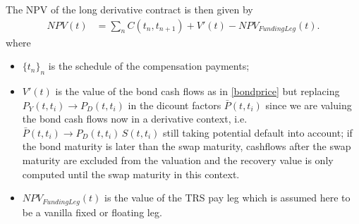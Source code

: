 \medskip
The NPV of the long derivative contract is then given by
%
\begin{align*}
NPV(t)&=\sum_{n}C(t_n,t_{n+1})+V'(t)-NPV_{FundingLeg}(t).
\end{align*}
where 
\begin{itemize}
\item $\{t_n\}_n$ is the schedule of the compensation
payments;
\item $V'(t)$ is the value of the bond cash flows as in
\eqref{bondprice} but replacing $P_Y(t,t_i)\rightarrow
P_D(t,t_i)$ in the dicount factors $\bar{P}(t,t_i)$
 since we are valuing the bond cash flows
now in a derivative context, i.e. $\bar{P}(t,t_i) \rightarrow
P_D(t,t_i)\,S(t,t_i)$ still taking potential default into account; if the bond maturity is later than the swap maturity,
cashflows after the swap maturity are excluded from the valuation and the recovery value is only computed until the swap
maturity in this context.
\item $NPV_{FundingLeg}(t)$ is the value of the TRS pay leg which is
 assumed here to be  a vanilla fixed or floating leg. 
\end{itemize}


